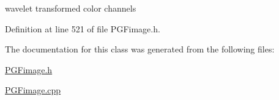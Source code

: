 wavelet transformed color channels 



Definition at line 521 of file P\+G\+Fimage.\+h.



The documentation for this class was generated from the following files\+:\begin{DoxyCompactItemize}
\item 
\mbox{\hyperlink{PGFimage_8h}{P\+G\+Fimage.\+h}}\item 
\mbox{\hyperlink{PGFimage_8cpp}{P\+G\+Fimage.\+cpp}}\end{DoxyCompactItemize}
